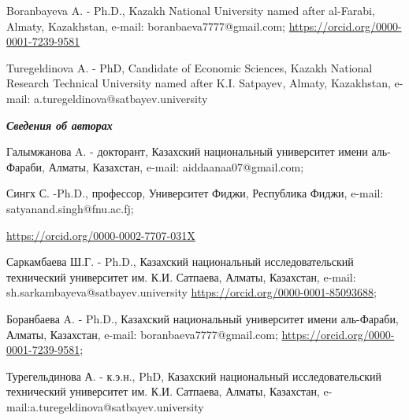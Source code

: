 Boranbayeva A. - Ph.D., Kazakh National University named after
al-Farabi, Almaty, Kazakhstan, e-mail: boranbaeva7777@gmail.com;
\url{https://orcid.org/0000-0001-7239-9581}

Turegeldinova A. - PhD, Candidate of Economic Sciences, Kazakh National
Research Technical University named after K.I. Satpayev, Almaty,
Kazakhstan, e-mail: a.turegeldinova@satbayev.university

\emph{{\bfseries Сведения об авторах}}

Галымжанова A. - докторант, Казахский национальный университет имени
аль-Фараби, Алматы, Казахстан, e-mail: aiddaanaa07@gmail.com;

Сингх С. -Ph.D., профессор, Университет Фиджи, Республика Фиджи, e-mail:
satyanand.singh@fnu.ac.fj;

\href{https://www.scopus.com/redirect.uri?url=https://orcid.org/0000-0002-7707-031X&authorId=55697935700&origin=AuthorProfile&orcId=0000-0002-7707-031X&category=orcidLink}{https://orcid.org/0000-0002-7707-031X}

Саркамбаева Ш.Г. - Ph.D., Казахский национальный исследовательский
технический университет им. К.И. Сатпаева, Алматы, Казахстан, e-mail:
sh.sarkambayeva@satbayev.university
\url{https://orcid.org/0000-0001-85093688};

Боранбаева A. - Ph.D., Казахский национальный университет имени
аль-Фараби, Алматы, Казахстан, e-mail: boranbaeva7777@gmail.com;
\url{https://orcid.org/0000-0001-7239-9581};

Турегельдинова А. - к.э.н., PhD, Казахский национальный
исследовательский технический университет им. К.И. Сатпаева, Алматы,
Казахстан, e-mail:a.turegeldinova@satbayev.university
